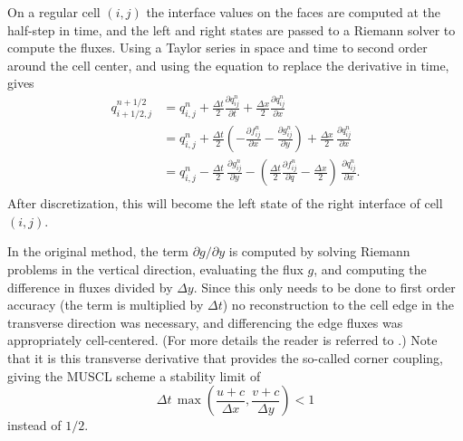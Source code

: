On a regular cell $(i,j)$ the interface values on the 
faces are computed at the half-step in time, and the left and right states
are passed to a Riemann
solver to compute the fluxes.
Using a Taylor series in space and time to second order around the
cell center, and using the equation to replace the derivative in time,  gives
\begin{equation}\label{taylor}
\begin{split}
q_{i+1/2,j}^{n+1/2} & = q_{i,j}^n + 
              \frac{\Delta t}{2} \frac{\partial q_{ij}^n}{\partial t} + 
              \frac{\Delta x}{2} \frac{\partial q_{ij}^n}{\partial x} \\[.08in]
            &  = q_{i,j}^n + \frac{\Delta t}{2} 
            (-\frac{\partial f_{ij}^n}{\partial x} -
             \frac{\partial g_{ij}^n}{\partial y})  +
             \frac{\Delta x}{2} \, \frac{\partial q_{ij}^n}{\partial x} \\[.08in]
            &  = q_{i,j}^n - \frac{\Delta t}{2} \, 
             \frac{\partial g_{ij}^n}{\partial y}  -
            ( \frac{\Delta t}{2} 
            \frac{\partial f_{ij}^n}{\partial q} -
             \frac{\Delta x}{2} ) \,\frac{\partial q_{ij}^n}{\partial x} . \\[.08in]
\end{split}
\end{equation}
After discretization, this will become the left state of the right interface
of cell $(i,j)$.

In the original method, the term $\partial g / \partial y$ is computed by solving Riemann
problems in the vertical direction,  evaluating the flux $g$, and computing the
difference in fluxes divided by $\Delta y$.
Since this only needs to be done to first order accuracy (the term is multiplied
by $\Delta t$)  no reconstruction to the cell edge  in the transverse 
direction was necessary,
and differencing the edge fluxes was appropriately cell-centered.
(For more details the reader is referred to \cite{Colella:Unsplit}.)
Note that it is this transverse derivative that provides the so-called corner coupling,
giving the MUSCL scheme a stability limit of
\begin{equation}
\label{eqn:bigcfllimit}
\Delta t \, \max \left (\frac{u+c}{\Delta x} , \frac{v+c}{\Delta y} \right) < 1
\end{equation}
instead of $1/2$.

